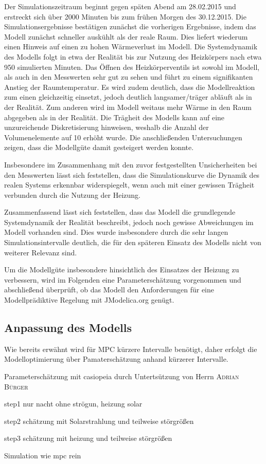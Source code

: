 Der Simulationszeitraum beginnt gegen späten Abend am 28.02.2015 und erstreckt sich über 2000 Minuten bis zum frühen Morgen des 30.12.2015. Die Simulationsergebnisse bestätigen zunächst die vorherigen Ergebnisse, indem das Modell zunächst schneller auskühlt als der reale Raum. Dies liefert wiederum einen Hinweis auf einen zu hohen Wärmeverlust im Modell.
Die Systemdynamik des Modells folgt in etwa der Realität bis zur Nutzung des Heizkörpers nach etwa 950 simulierten Minuten. 
Das Öffnen des Heizkörperventils ist sowohl im Modell, als auch in den Messwerten sehr gut zu sehen und führt zu einem signifikanten Anstieg der Raumtemperatur. Es wird zudem deutlich, dass die Modellreaktion zum einen gleichzeitig einsetzt, jedoch deutlich langsamer/träger abläuft als in der Realität. Zum anderen wird im Modell weitaus mehr Wärme in den Raum abgegeben als in der Realität.
Die Trägheit des Modells kann auf eine unzureichende Diskretisierung hinweisen, weshalb die Anzahl der Volumenelemente auf 10 erhöht wurde. Die anschließenden Untersuchungen zeigen, dass die Modellgüte damit gesteigert werden konnte.

Insbesondere im Zusammenhang mit den zuvor festgestellten Unsicherheiten bei den Messwerten lässt sich feststellen, dass die  Simulationskurve die Dynamik des realen Systems erkennbar widerspiegelt, wenn auch mit einer gewissen Trägheit verbunden durch die Nutzung der Heizung.

Zusammenfassend lässt sich feststellen, dass das Modell die grundlegende Systemdynamik der Realität beschreibt, jedoch noch gewisse Abweichungen im Modell vorhanden sind. Dies wurde insbesondere durch die sehr langen Simulationsintervalle deutlich, die für den späteren Einsatz des Modells nicht von weiterer Relevanz sind.

 Um die Modellgüte insbesondere hinsichtlich des Einsatzes der Heizung zu verbessern, wird im Folgenden eine Parameterschätzung vorgenommen und abschließend überprüft, ob das Modell den Anforderungen für eine Modellprädiktive Regelung mit JModelica.org genügt.


\subsection{Anpassung des Modells}

Wie bereits erwähnt wird für MPC kürzere Intervalle benötigt, daher erfolgt die Modelloptimierung über Pamaterschätzung anhand kürzerer Intervalle.

Parameterschätzung mit casiopeia durch Untertsützung von Herrn \textsc{Adrian Bürger}



step1 nur nacht ohne strögun, heizung solar

step2 schätzung mit Solarstrahlung und teilweise störgrößen

step3 schätzung mit heizung und teilweise störgrößen

Simulation wie mpc rein

